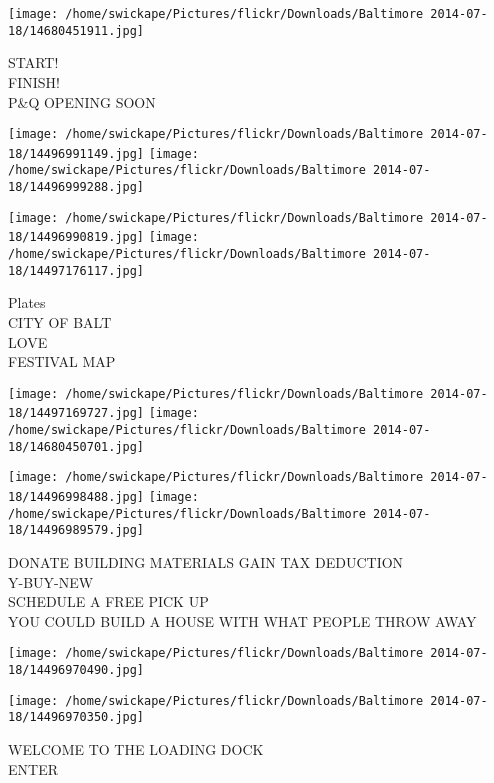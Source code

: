 \documentclass[10pt,letterpaper]{article}
\begin{document}
\vspace{0.25in}
\texttt{[image: /home/swickape/Pictures/flickr/Downloads/Baltimore 2014-07-18/14680451911.jpg]}

START!\\
FINISH!\\
P\&Q OPENING SOON\\
\pagebreak

\texttt{[image: /home/swickape/Pictures/flickr/Downloads/Baltimore 2014-07-18/14496991149.jpg]}
\texttt{[image: /home/swickape/Pictures/flickr/Downloads/Baltimore 2014-07-18/14496999288.jpg]}

\texttt{[image: /home/swickape/Pictures/flickr/Downloads/Baltimore 2014-07-18/14496990819.jpg]}
\texttt{[image: /home/swickape/Pictures/flickr/Downloads/Baltimore 2014-07-18/14497176117.jpg]}

Plates\\
CITY OF BALT\\
LOVE\\
FESTIVAL MAP\\
\pagebreak

\texttt{[image: /home/swickape/Pictures/flickr/Downloads/Baltimore 2014-07-18/14497169727.jpg]}
\texttt{[image: /home/swickape/Pictures/flickr/Downloads/Baltimore 2014-07-18/14680450701.jpg]}

\texttt{[image: /home/swickape/Pictures/flickr/Downloads/Baltimore 2014-07-18/14496998488.jpg]}
\texttt{[image: /home/swickape/Pictures/flickr/Downloads/Baltimore 2014-07-18/14496989579.jpg]}

DONATE BUILDING MATERIALS GAIN TAX DEDUCTION\\
Y{-}BUY{-}NEW\\
SCHEDULE A FREE PICK UP\\
YOU COULD BUILD A HOUSE WITH WHAT PEOPLE THROW AWAY\\
\pagebreak

\texttt{[image: /home/swickape/Pictures/flickr/Downloads/Baltimore 2014-07-18/14496970490.jpg]}

\vspace{0.25in}
\texttt{[image: /home/swickape/Pictures/flickr/Downloads/Baltimore 2014-07-18/14496970350.jpg]}

WELCOME TO THE LOADING DOCK\\
ENTER\\
\pagebreak
\end{document}
